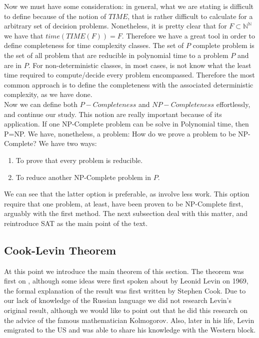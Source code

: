 Now we must have some consideration: in general, what we are stating is difficult to define because of the notion of $TIME$, that is rather difficult to calculate for a arbitrary set of decision problems. Nonetheless, it is pretty clear that for $F\subset \mathbb{N}^\mathbb{N}$ we have that $time(TIME(F)) = F$. Therefore we have a great tool in order to define completeness for time complexity classes. The set of $P$ complete problem is the set of all problem that are reducible in polynomial time to a problem $P$ and are in $P$. For non-deterministic classes, in most cases, is not know what the least time required to compute/decide every problem encompassed. Therefore the most common approach is to define the completeness with the associated deterministic complexity, as we have done.\\

Now we can define both $P-Completeness$ and $NP-Completeness$ effortlessly, and continue our study. This notion are really important because of its application. If one NP-Complete problem can be solve in Polynomial time, then P=NP. We have, nonetheless, a problem: How do we prove a problem to be NP-Complete? We have two ways:
\begin{enumerate}
\item To prove that every problem is reducible.
\item To reduce another NP-Complete problem in $P$.
\end{enumerate}

We can see that the latter option is preferable, as involve less work. This option require that one problem, at least, have been proven to be NP-Complete first, arguably with the first method. The next subsection deal with this matter, and reintroduce SAT as the main point of the text. 


\subsection{Cook-Levin Theorem}
At this point we introduce the main theorem of this section. The theorem was first on \cite{cook1971complexity}, although some ideas were first spoken about by Leonid Levin on 1969, the formal explanation of the result was first written by Stephen Cook. Due to our lack of knowledge of the Russian language we did not research Levin's original result, although we would like to point out that he did this research on the advice of the famous mathematician Kolmogorov. Also, later in his life, Levin emigrated to the US and was able to share his knowledge with the Western block\cite{cvlevincook}.\\




